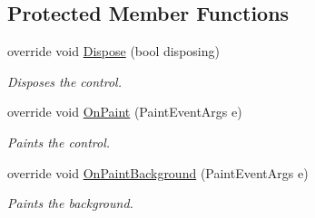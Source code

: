 \subsection*{Protected Member Functions}
\begin{DoxyCompactItemize}
\item 
override void \hyperlink{class_tao_1_1_platform_1_1_windows_1_1_simple_open_gl_control_a31f5de2b852c07d56a31363f3b212f86}{Dispose} (bool disposing)
\begin{DoxyCompactList}\small\item\em Disposes the control. \item\end{DoxyCompactList}\item 
override void \hyperlink{class_tao_1_1_platform_1_1_windows_1_1_simple_open_gl_control_a8391cfeeae38c1bc62a7e3850779e11a}{OnPaint} (PaintEventArgs e)
\begin{DoxyCompactList}\small\item\em Paints the control. \item\end{DoxyCompactList}\item 
override void \hyperlink{class_tao_1_1_platform_1_1_windows_1_1_simple_open_gl_control_a50dca65b70c55e761640006975bde52a}{OnPaintBackground} (PaintEventArgs e)
\begin{DoxyCompactList}\small\item\em Paints the background. \item\end{DoxyCompactList}\end{DoxyCompactItemize}
